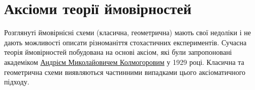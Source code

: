 
\newlength\Radius
\setlength\Radius{2cm}

\section{Аксіоми теорії ймовірностей}
Розглянуті ймовірнісні схеми (класична, геометрична) мають свої недоліки і не дають можливості описати різноманіття стохастичних експериментів.
Сучасна теорія ймовірностей побудована на основі аксіом, які були запропоновані академіком 
\href{https://uk.wikipedia.org/wiki/%D0%9A%D0%BE%D0%BB%D0%BC%D0%BE%D0%B3%D0%BE%D1%80%D0%BE%D0%B2_%D0%90%D0%BD%D0%B4%D1%80%D1%96%D0%B9_%D0%9C%D0%B8%D0%BA%D0%BE%D0%BB%D0%B0%D0%B9%D0%BE%D0%B2%D0%B8%D1%87}{Андрієм Миколайовичем Колмогоровим} у 1929 році.
Класична та геометрична схеми виявляються частинними випадками цього аксіоматичного підходу.

